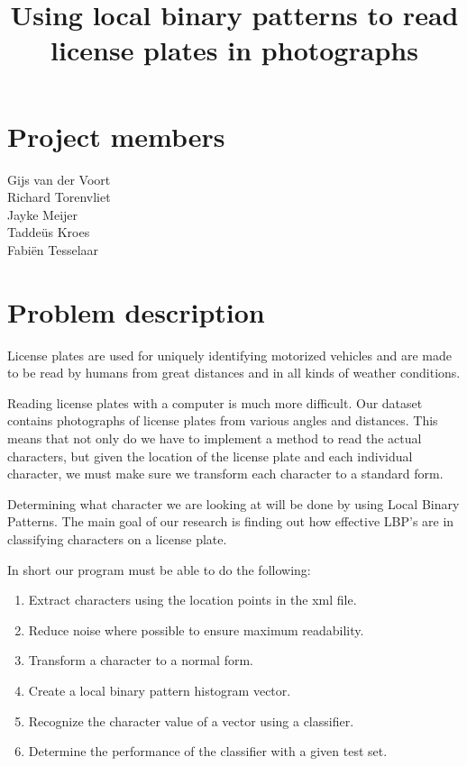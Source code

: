 \documentclass[a4paper]{article}
\title{Using local binary patterns to read license plates in photographs}
\begin{document}
\maketitle

\section*{Project members}
Gijs van der Voort \\
Richard Torenvliet \\
Jayke Meijer \\
Tadde\"us Kroes\\
Fabi\"en Tesselaar

\tableofcontents
\pagebreak

\setcounter{secnumdepth}{1}

\section{Problem description}

License plates are used for uniquely identifying motorized vehicles and are
made to be read by humans from great distances and in all kinds of weather
conditions.

Reading license plates with a computer is much more difficult. Our dataset
contains photographs of license plates from various angles and distances. This
means that not only do we have to implement a method to read the actual
characters, but given the location of the license plate and each individual
character, we must make sure we transform each character to a standard form.

Determining what character we are looking at will be done by using Local Binary
Patterns. The main goal of our research is finding out how effective LBP's are
in classifying characters on a license plate.

In short our program must be able to do the following:

\begin{enumerate}
    \item Extract characters using the location points in the xml file.
    \item Reduce noise where possible to ensure maximum readability.
    \item Transform a character to a normal form.
    \item Create a local binary pattern histogram vector.
    \item Recognize the character value of a vector using a classifier.
    \item Determine the performance of the classifier with a given test set.
\end{enumerate}
\end{document}
